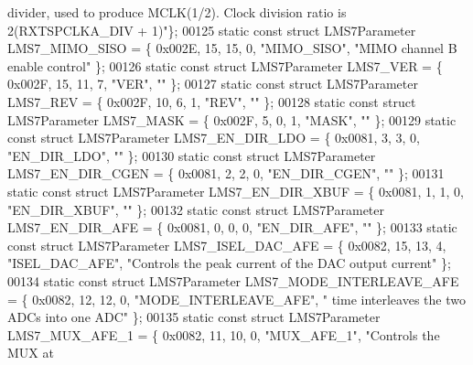 \begin{DoxyCode}
{       divider, used to produce MCLK(1/2). Clock division ratio is 2(RXTSPCLKA\_DIV + 1)"}\};
00125 \textcolor{keyword}{static} \textcolor{keyword}{const} \textcolor{keyword}{struct }LMS7Parameter LMS7_MIMO_SISO = \{ 0x002E, 15, 15, 0, \textcolor{stringliteral}{"MIMO\_SISO"}, \textcolor{stringliteral}{"MIMO channel B enable
       control"} \};
00126 \textcolor{keyword}{static} \textcolor{keyword}{const} \textcolor{keyword}{struct }LMS7Parameter LMS7_VER = \{ 0x002F, 15, 11, 7, \textcolor{stringliteral}{"VER"}, \textcolor{stringliteral}{""} \};
00127 \textcolor{keyword}{static} \textcolor{keyword}{const} \textcolor{keyword}{struct }LMS7Parameter LMS7_REV = \{ 0x002F, 10, 6, 1, \textcolor{stringliteral}{"REV"}, \textcolor{stringliteral}{""} \};
00128 \textcolor{keyword}{static} \textcolor{keyword}{const} \textcolor{keyword}{struct }LMS7Parameter LMS7_MASK = \{ 0x002F, 5, 0, 1, \textcolor{stringliteral}{"MASK"}, \textcolor{stringliteral}{""} \};
00129 \textcolor{keyword}{static} \textcolor{keyword}{const} \textcolor{keyword}{struct }LMS7Parameter LMS7_EN_DIR_LDO = \{ 0x0081, 3, 3, 0, \textcolor{stringliteral}{"EN\_DIR\_LDO"}, \textcolor{stringliteral}{""} \};
00130 \textcolor{keyword}{static} \textcolor{keyword}{const} \textcolor{keyword}{struct }LMS7Parameter LMS7_EN_DIR_CGEN = \{ 0x0081, 2, 2, 0, \textcolor{stringliteral}{"EN\_DIR\_CGEN"}, \textcolor{stringliteral}{""} \};
00131 \textcolor{keyword}{static} \textcolor{keyword}{const} \textcolor{keyword}{struct }LMS7Parameter LMS7_EN_DIR_XBUF = \{ 0x0081, 1, 1, 0, \textcolor{stringliteral}{"EN\_DIR\_XBUF"}, \textcolor{stringliteral}{""} \};
00132 \textcolor{keyword}{static} \textcolor{keyword}{const} \textcolor{keyword}{struct }LMS7Parameter LMS7_EN_DIR_AFE = \{ 0x0081, 0, 0, 0, \textcolor{stringliteral}{"EN\_DIR\_AFE"}, \textcolor{stringliteral}{""} \};
00133 \textcolor{keyword}{static} \textcolor{keyword}{const} \textcolor{keyword}{struct }LMS7Parameter LMS7_ISEL_DAC_AFE = \{ 0x0082, 15, 13, 4, \textcolor{stringliteral}{"ISEL\_DAC\_AFE"}, \textcolor{stringliteral}{"Controls the
       peak current of the DAC output current"} \};
00134 \textcolor{keyword}{static} \textcolor{keyword}{const} \textcolor{keyword}{struct }LMS7Parameter LMS7_MODE_INTERLEAVE_AFE = \{ 0x0082, 12, 12, 0, \textcolor{stringliteral}{"MODE\_INTERLEAVE\_AFE"}, \textcolor{stringliteral}{"
      time interleaves the two ADCs into one ADC"} \};
00135 \textcolor{keyword}{static} \textcolor{keyword}{const} \textcolor{keyword}{struct }LMS7Parameter LMS7_MUX_AFE_1 = \{ 0x0082, 11, 10, 0, \textcolor{stringliteral}{"MUX\_AFE\_1"}, \textcolor{stringliteral}{"Controls the MUX at
}
\end{DoxyCode}

